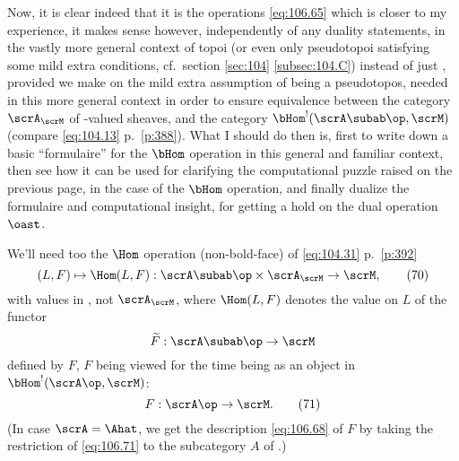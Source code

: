 Now, it is clear indeed that it is the operations
\eqref{eq:106.65} which is closer to my experience, it
makes sense however, independently of any duality statements, in the
vastly more general context of topoi \scrA{} (or even only pseudotopoi
satisfying some mild extra conditions, cf.\ section \ref{sec:104}
\ref{subsec:104.C}) instead of just \Ahat, provided we make on \scrM{}
the mild extra assumption of being a pseudotopos, needed in this more
general context in order to ensure equivalence between the category
$\scrA_\scrM$ of \scrM-valued sheaves, and the category
$\bHom^!({\scrA\subab}\op,\scrM)$ (compare \eqref{eq:104.13} p.\
\ref{p:388}). What I should do then is, first to write down a basic
``formulaire'' for the $\bHom$ operation in this general and familiar
context, then see how it can be used for clarifying the computational
puzzle raised on the previous page, in the case of the $\bHom$
operation, and finally dualize the formulaire and computational
insight, for getting a hold on the dual operation $\oast$.

We'll need too the $\Hom$ operation (non-bold-face) of
\eqref{eq:104.31} p.\ \ref{p:392}
\begin{equation}
  \label{eq:106.70}
  (L,F)\mapsto \Hom(L,F) : {\scrA\subab}\op \times \scrA_\scrM \to
  \scrM,\tag{70} 
\end{equation}
with values in \scrM, not $\scrA_\scrM$, where $\Hom(L,F)$ denotes the
value on $L$ of the functor
\[\widetilde F : {\scrA\subab}\op\to\scrM\]
defined by $F$, $F$ being viewed for the time being as an object in
$\bHom^!(\scrA\op,\scrM)$:
\begin{equation}
  \label{eq:106.71}
  F:\scrA\op\to\scrM.\tag{71}
\end{equation}
(In case $\scrA=\Ahat$, we get the description \eqref{eq:106.68} of
$F$ by taking the restriction of \eqref{eq:106.71} to the subcategory
$A$ of \Ahat.)

